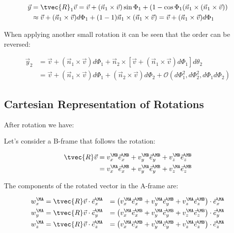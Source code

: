 \documentclass[10pt,a4paper]{scrartcl}
\begin{document}
\begin{multicols*}{2}

\begin{align*}
\vec{y}&=\tvec{R}_1\vec{v}=\vec{v}+(\vec{n}_1\times\vec{v})\sin\Phi_1+(1-\cos\Phi_1(\vec{n}_1\times(\vec{n}_1\times\vec{v}))\\
&\approx\vec{v}+(\vec{n}_1\times\vec{v})d\Phi_1+(1-1)\vec{n}_1\times(\vec{n}_1\times\vec{v})=\vec{v}+(\vec{n}_1\times\vec{v})d\Phi_1
\end{align*}

When applying another small rotation it can be seen that the order can be reversed:

\begin{align*}
\vec{y}_2&=\vec{v}+(\vec{n}_1\times\vec{v})d\Phi_1+\vec{n}_2\times\left[\vec{v}+(\vec{n}_1\times\vec{v})d\Phi_1\right]d\theta_2\\
&=\vec{v}+(\vec{n}_1\times\vec{v})d\Phi_1+(\vec{n}_2\times\vec{v})d\Phi_2+\mathcal{O}(d\Phi_1^2,d\Phi_2^2,d\Phi_1d\Phi_2)
\end{align*}

\subsection{Cartesian Representation of Rotations}



After rotation we have:


Let's consider a B-frame that follows the rotation:

\begin{align*}
\tvec{R}\vec{v}&=v_x^\MB\vec{e}_x^\MB+v_y^\MB\vec{e}_y^\MB+v_z^\MB\vec{e}_z^\MB\\
&=v_x^\MA\vec{e}_x^\MB+v_y^\MA\vec{e}_y^\MB+v_z^\MA\vec{e}_z^\MB
\end{align*}

The components of the rotated vector in the A-frame are:

\begin{align*}
w_x^\MA&=\tvec{R}\vec{v}\cdot\vec{e}_x^\MA&=\left(v_x^\MA\vec{e}_x^\MB+v_y^\MA\vec{e}_y^\MB+v_z^\MA\vec{e}_z^\MB\right)\cdot\vec{e}_x^\MA\\
w_y^\MA&=\tvec{R}\vec{v}\cdot\vec{e}_y^\MA&=\left(v_x^\MA\vec{e}_x^\MB+v_y^\MA\vec{e}_y^\MB+v_z^\MA\vec{e}_z^\MB\right)\cdot\vec{e}_y^\MA\\
w_z^\MA&=\tvec{R}\vec{v}\cdot\vec{e}_z^\MA&=\left(v_x^\MA\vec{e}_x^\MB+v_y^\MA\vec{e}_y^\MB+v_z^\MA\vec{e}_z^\MB\right)\cdot\vec{e}_z^\MA
\end{align*}


\end{multicols*}
\end{document}
